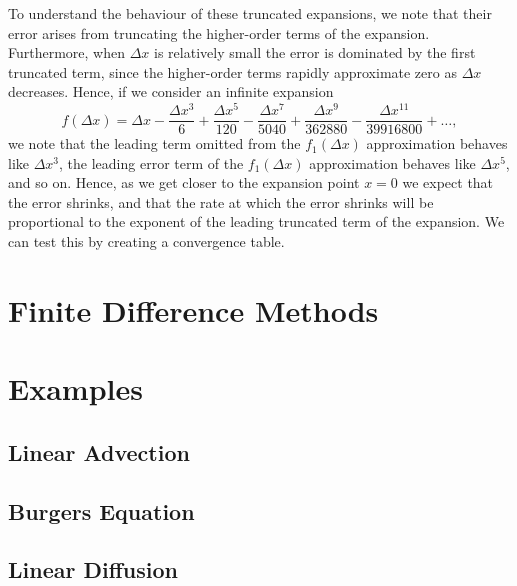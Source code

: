 To understand the behaviour of these truncated expansions, we note that their error arises from truncating the higher-order terms of the expansion. Furthermore, when $\Delta x$ is relatively small the error is dominated by the first truncated term, since the higher-order terms rapidly approximate zero as $\Delta x$ decreases. Hence, if we consider an infinite expansion
\begin{equation}
	f(\Delta x) = \Delta x - \frac{\Delta x^3}{6} + \frac{\Delta x^5}{120} - \frac{\Delta x^7}{5040} + \frac{\Delta x^9}{362880} - \frac{\Delta x^{11}}{39916800} + \hdots,
\end{equation}
we note that the leading term omitted from the $f_1(\Delta x)$ approximation behaves like $\Delta x^3$, the leading error term of the $f_1(\Delta x)$ approximation behaves like $\Delta x^5$, and so on. Hence, as we get closer to the expansion point $x=0$ we expect that the error shrinks, and that the rate at which the error shrinks will be proportional to the exponent of the leading truncated term of the expansion. We can test this by creating a convergence table.
	
\chapter{Finite Difference Methods}

\chapter{Examples}

\section{Linear Advection}

\section{Burgers Equation}

\section{Linear Diffusion}